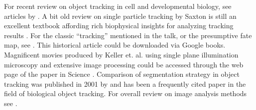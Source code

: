 \documentclass[11pnt]{article}
\begin{document}
For recent review on object tracking in cell and developmental biology, see  articles by \cite{Meijering2012}. A bit old review on single particle tracking by Saxton is still an excellent textbook affording rich biophysical insights for analyzing tracking results \citep{Saxton1997}. For the classic ``tracking'' mentioned in the talk, or the presumptive fate map, see \cite{Vogt1925}. This historical article could be downloaded via Google books. Magnificent movies produced by Keller et. al. using single plane illumination microscopy and extensive image processing could be accessed through the web page of the paper in Science \citep{Keller2008}. Comparison of segmentation strategy in object tracking was published in 2001 by \cite{Cheezum2001a} and has been a frequently cited paper in the field of biological object tracking. For overall review on image analysis methods see \cite{Hamilton2009}.
\end{document}
